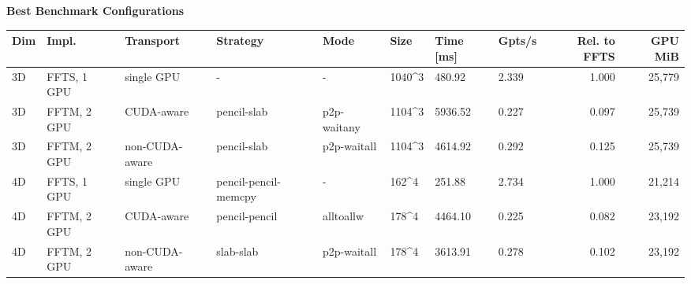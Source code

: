 \documentclass{article}
\begin{document}
\begin{center}
{\fontsize{8.0pt}{9.4pt}\selectfont
\textbf{Best Benchmark Configurations}

\vspace{0.6em}
\begin{tabular}{llllllllrr}
\hline
Dim & Impl. & Transport & Strategy & Mode & Size & Time [ms] & Gpts/s & Rel. to FFTS & GPU MiB \\
\hline
3D & FFTS, 1 GPU & single GPU & - & - & 1040\textasciicircum{}3 & 480.92 & 2.339 & 1.000 & 25,779 \\
3D & FFTM, 2 GPU & CUDA-aware & pencil-slab & p2p-waitany & 1104\textasciicircum{}3 & 5936.52 & 0.227 & 0.097 & 25,739 \\
3D & FFTM, 2 GPU & non-CUDA-aware & pencil-slab & p2p-waitall & 1104\textasciicircum{}3 & 4614.92 & 0.292 & 0.125 & 25,739 \\
4D & FFTS, 1 GPU & single GPU & pencil-pencil-memcpy & - & 162\textasciicircum{}4 & 251.88 & 2.734 & 1.000 & 21,214 \\
4D & FFTM, 2 GPU & CUDA-aware & pencil-pencil & alltoallw & 178\textasciicircum{}4 & 4464.10 & 0.225 & 0.082 & 23,192 \\
4D & FFTM, 2 GPU & non-CUDA-aware & slab-slab & p2p-waitall & 178\textasciicircum{}4 & 3613.91 & 0.278 & 0.102 & 23,192 \\
\hline
\end{tabular}
}
\end{center}
\end{document}
